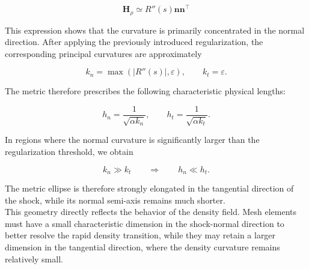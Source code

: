 \documentclass[11pt,a4paper]{article}
\begin{document}
\begin{equation}
    \mathbf{H}_\rho
    \simeq
    R''(s)\mathbf{n}\mathbf{n}^{\top}
\end{equation}

\noindent
This expression shows that the curvature
is primarily concentrated in the normal
direction.
After applying the previously introduced
regularization, the corresponding principal
curvatures are approximately

\begin{equation}
    k_n=\max\left(|R''(s)|,\varepsilon\right),
    \qquad
    k_t=\varepsilon.
\end{equation}

\noindent
The metric therefore prescribes the following
characteristic physical lengths:

\begin{equation}
    \boxed{
        h_n=\frac{1}{\sqrt{\alpha k_n}},
        \qquad
        h_t=\frac{1}{\sqrt{\alpha k_t}}.
    }
\end{equation}

\noindent
In regions where the normal curvature is
significantly larger than the regularization
threshold, we obtain

\begin{equation}
    k_n\gg k_t
    \qquad\Longrightarrow\qquad
    h_n\ll h_t.
\end{equation}

\noindent
The metric ellipse is therefore strongly
elongated in the tangential direction of
the shock, while its normal semi-axis
remains much shorter.\\

\noindent
This geometry directly reflects the behavior
of the density field. Mesh elements must
have a small characteristic dimension in
the shock-normal direction to better resolve
the rapid density transition, while they may
retain a larger dimension in the tangential
direction, where the density curvature
remains relatively small.



\end{document}
